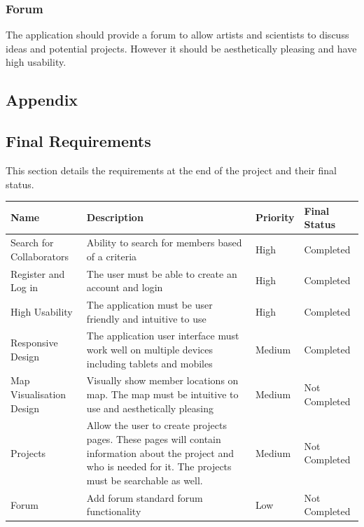 \documentclass[a4paper,oneside,11pt]{report}
\begin{document}
\subsection{Forum}
The application should provide a forum to allow artists and scientists to discuss ideas and potential projects. However it should be aesthetically pleasing and have high usability. 
\printbibliography

\begin{appendices}
\chapter{Appendix}

\section{Final Requirements}
This section details the requirements at the end of the project and their final status.
\begin{center}
	\begin{table}[!ht]
    \begin{tabular}[ht]{| p{5cm} | p{5cm} | l | l |}
    \hline
    Name & Description & Priority & Final Status\\ 
    \hline
  Search for Collaborators & Ability to search for members based of a criteria & High &  Completed \\
	\hline
	Register and Log in & The user must be able to create an account and login & High & Completed \\
	\hline
	High Usability & The application must be user friendly and intuitive to use & High & Completed 	     \\
	\hline
	Responsive Design & The application user interface must work well on multiple devices including tablets and mobiles & Medium & Completed 	     \\
	\hline
	Map Visualisation Design & Visually show member locations on map. The map must be intuitive to use and aesthetically pleasing & Medium & Not Completed 	     \\
	\hline
	
	Projects & Allow the user to create projects pages. These pages will contain information about the project and who is needed for it. The projects must be searchable as well. & Medium & Not Completed 	     \\
	\hline
	
		Forum & Add forum standard forum functionality & Low & Not Completed 	     \\
	\hline
	

\end{tabular}
\end{table}
\end{center}
\end{appendices}
\end{document}
